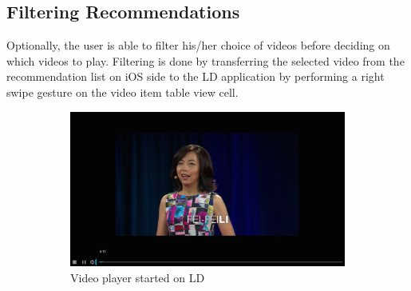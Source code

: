 \subsection{Filtering Recommendations}
Optionally, the user is able to filter his/her choice of videos before deciding on which videos to play. 
Filtering is done by transferring the selected video from the recommendation list on iOS side to the LD application by performing a right swipe gesture on the video item table view cell. 
\begin{figure}
    \centering
    \begin{subfigure}[b]{0.6\textwidth}
        \includegraphics[width=\textwidth]{figures/playerLD}
        \caption{Video player started on LD}
        \label{fig:figure46a}
    \end{subfigure}
    ~ %
    \begin{subfigure}[b]{0.3\textwidth}

\end{subfigure}
\end{figure}
